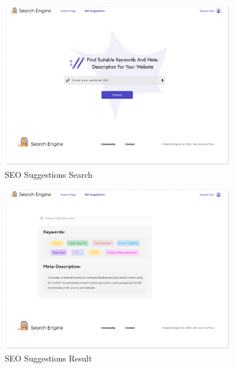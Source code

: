 \documentclass{scrartcl}
\begin{document}
\begin{figure}[H]
  \centering
  \includegraphics[width=0.90\textwidth]{seo-suggestions.pdf}
  \caption{SEO Suggestions Search}
\end{figure}

\begin{figure}[H]
  \centering
  \includegraphics[width=0.90\textwidth]{seo-suggestions-result.pdf}
  \caption{SEO Suggestions Result}
\end{figure}
\end{document}
